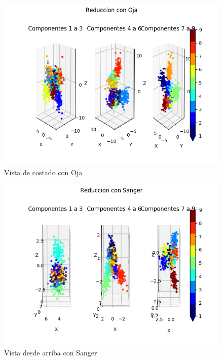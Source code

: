 \begin{figure}[H]
  \includegraphics[width=160mm]{imagenes/componentes_oja_3.png}
  \caption{Vista de costado con Oja}
\end{figure}

\begin{figure}[H]
  \includegraphics[width=160mm]{imagenes/componentes_sanger_1.png}
  \caption{Vista desde arriba con Sanger}
\end{figure}

